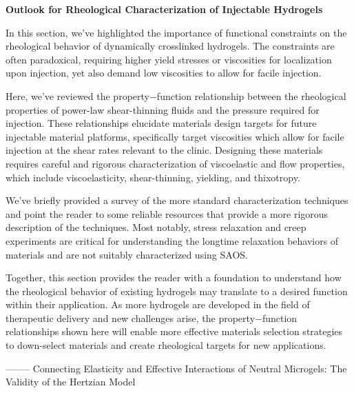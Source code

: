 \documentclass[../../main-notes.tex]{subfiles}
\begin{document}
\textbf{Outlook for Rheological Characterization of Injectable Hydrogels}

In this section, we’ve highlighted the importance of functional constraints on the rheological behavior of dynamically crosslinked hydrogels. 
The constraints are often paradoxical, requiring higher yield stresses or viscosities for localization upon injection, yet also demand low viscosities to allow for facile injection. 

Here, we’ve reviewed the property−function relationship between the rheological properties of power-law shear-thinning fluids and the pressure required for injection. 
These relationships elucidate materials design targets for future injectable material platforms, specifically target viscosities which allow for facile injection at the shear rates relevant to the clinic. 
Designing these materials requires careful and rigorous characterization of viscoelastic and flow properties, which include viscoelasticity, shear-thinning, yielding, and thixotropy. 

We’ve briefly provided a survey of the more standard characterization techniques and point the reader to some reliable resources that provide a more rigorous description of the techniques. 
Most notably, stress relaxation and creep experiments are critical for understanding the longtime relaxation behaviors of materials and are not suitably characterized using SAOS. 

Together, this section provides the reader with a foundation to understand how the rheological behavior of existing hydrogels may translate to a desired function within their application. 
As more hydrogels are developed in the field of therapeutic delivery and new challenges arise, the property−function relationships shown here will enable more effective materials selection strategies to down-select materials and create rheological targets for new applications.

--------
Connecting Elasticity and Effective Interactions of Neutral Microgels: The Validity of the Hertzian Model\citep{rovigattiConnectingElasticityEffective2019}

\end{document}
